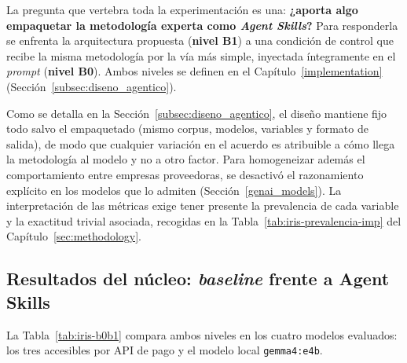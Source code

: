 
La pregunta que vertebra toda la experimentación es una: \textbf{¿aporta algo
empaquetar la metodología experta como \textit{Agent Skills}?} Para responderla se
enfrenta la arquitectura propuesta (\textbf{nivel B1}) a una condición de control
que recibe la misma metodología por la vía más simple, inyectada íntegramente en el
\textit{prompt} (\textbf{nivel B0}). Ambos niveles se definen en el
Capítulo~\ref{implementation} (Sección~\ref{subsec:diseno_agentico}).

Como se detalla en la Sección~\ref{subsec:diseno_agentico}, el diseño mantiene fijo
todo salvo el empaquetado (mismo corpus, modelos, variables y formato de salida),
de modo que cualquier variación en el acuerdo es atribuible a cómo llega la
metodología al modelo y no a otro factor. Para homogeneizar además el comportamiento
entre empresas proveedoras, se desactivó el razonamiento explícito en los modelos que lo
admiten (Sección~\ref{genai_models}). La
interpretación de las métricas exige tener presente la prevalencia de cada variable
y la exactitud trivial asociada, recogidas en la
Tabla~\ref{tab:iris-prevalencia-imp} del Capítulo~\ref{sec:methodology}.

\subsection{Resultados del núcleo: \textit{baseline} frente a Agent Skills}
\label{subsec:iris_core}

La Tabla~\ref{tab:iris-b0b1} compara ambos niveles en los cuatro modelos
evaluados: los tres accesibles por API de pago y el modelo local
\texttt{gemma4:e4b}.

